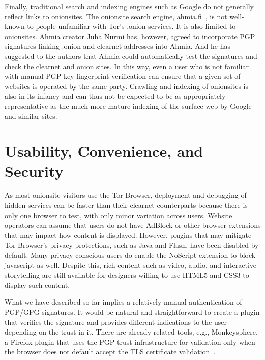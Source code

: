 \documentclass[10pt, conference, compsocconf]{styles/IEEEtran}
\begin{document}
Finally, traditional search and indexing engines such as Google do not
generally reflect links to onionsites. The onionsite
search engine, ahmia.fi~\cite{ahmia}, is not well-known to people
unfamiliar with Tor's .onion services. It is also limited to
onionsites. Ahmia creator Juha Nurmi has, however, agreed to
incorporate PGP signatures linking .onion and clearnet addresses into
Ahmia. And he has suggested to the authors that Ahmia could
automatically test the signatures and check the clearnet and onion
sites. In this way, even a user who is not familiar with manual PGP
key fingerprint verification can ensure that a given set of websites
is operated by the same party.  
Crawling and indexing of
onionsites is also in its infancy and can thus not be expected to be
as appropriately representative as the much more mature indexing of
the surface web by Google and similar sites.

\section{Usability, Convenience, and Security}

As most onionsite visitors use the Tor Browser, deployment and
debugging of hidden services can be faster than their clearnet
counterparts because there is only one browser to test, with only
minor variation across users.  Website operators can assume that users
do not have AdBlock or other browser extensions that may impact how
content is displayed.  However, plugins that may mitigate Tor
Browser's privacy protections, such as Java and Flash, have been
disabled by default.  Many privacy-conscious users do enable the
NoScript extension to block javascript as well.  Despite this, rich
content such as video, audio, and interactive storytelling are still
available for designers willing to use HTML5 and CSS3 to display such
content.

What we have described so far implies a relatively manual
authentication of PGP/GPG signatures. It would be natural and
straightforward to create a plugin that verifies the signature and
provides different indications to the user depending on the trust in
it.  There are already related tools, e.g., Monkeysphere, a Firefox
plugin that uses the PGP trust infrastructure for validation only when
the browser does not default accept the TLS certificate
validation~\cite{monkeysphere}.
\end{document}
